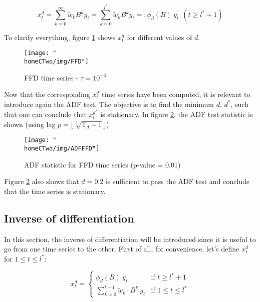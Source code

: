 \documentclass[a4paper]{report}
\newcommand{\homeCTwo}{../../Chapter 2 - FracDiff/Draft}
\begin{document}
\begin{equation}
	\label{eqn:FFD}
	x_t^d = \sum_{k = 0}^{\infty} \widetilde{w}_k B^k y_t = 
	\sum_{k = 0}^{l^*} \widetilde{w}_k B^k y_t =: \phi_d (B) \ y_t \ \ 
	(t \geq l^* + 1)
\end{equation}

To clarify everything, figure \ref{fig:FFD} shows $x_t^d$ for different 
values of $d$.

\begin{figure}[htbp]
\centering
	\texttt{[image: "\\homeCTwo/img/FFD"]}
	\caption{FFD time series - $\tau = 10^{-4}$}
	\label{fig:FFD}
\end{figure}

Now that the corresponding $x_t^d$ time series have been computed, it is 
relevant to introduce again the ADF test. The objective is to find the 
minimum $d$, $d^*$, such that one can conclude that $x_t^{d^*}$ is 
stationary. In figure \ref{fig:ADFFFD}, the ADF test statistic is shown 
(using lag $p = \lfloor \sqrt[3]{\text{T}_d - 1} \rfloor$).\\

\begin{figure}[htbp]
\centering
	\texttt{[image: "\\homeCTwo/img/ADFFFD"]}
	\caption{ADF statistic for FFD time series (p-value = 0.01)}
	\label{fig:ADFFFD}
\end{figure}

Figure \ref{fig:ADFFFD} also shows that $d = 0.2$ is sufficient to pass the 
ADF test and conclude that the time series is stationary.

\newpage

\subsection{Inverse of differentiation}
\label{sec:invDiff}
In this section, the inverse of differentiation will be introduced since it 
is useful to go from one time series to the other. First of all, for 
convenience, let's define $x_t^d$ for $1 \leq t \leq l^*$:

\begin{equation}
\label{eqn:xDiffAdapted}
	x_t^d =
	\begin{cases}
		\phi_d (B) \ y_t & \text{if } t \geq l^* + 1\\
		 \sum_{k = 0}^{t - 1} \widetilde{w}_k \cdot B^k \ y_t & \text{if } 
		 1 \leq t \leq l^*
	\end{cases}
\end{equation}
\end{document}
